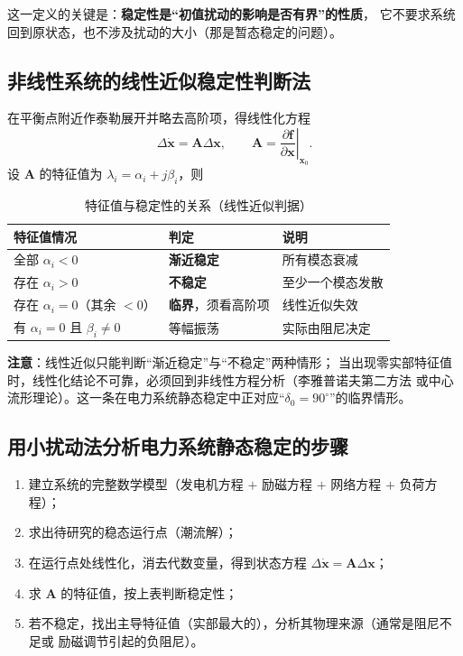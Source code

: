 这一定义的关键是：\textbf{稳定性是“初值扰动的影响是否有界”的性质}，
它不要求系统回到原状态，也不涉及扰动的大小（那是暂态稳定的问题）。

\subsection{非线性系统的线性近似稳定性判断法}

在平衡点附近作泰勒展开并略去高阶项，得线性化方程
\begin{equation}
  \Delta\dot{\boldsymbol x}=\boldsymbol A\Delta\boldsymbol x,
  \qquad \boldsymbol A=\left.\frac{\partial\boldsymbol f}{\partial\boldsymbol x}\right|_{\boldsymbol x_0}.
\end{equation}
设 $\boldsymbol A$ 的特征值为 $\lambda_i=\alpha_i+j\beta_i$，则
\begin{table}[htbp]
  \centering
  \caption{特征值与稳定性的关系（线性近似判据）}
  \small
  \begin{tabular}{@{}lll@{}}
    \toprule
    特征值情况 & 判定 & 说明 \\
    \midrule
    全部 $\alpha_i<0$ & \textbf{渐近稳定} & 所有模态衰减 \\
    存在 $\alpha_i>0$ & \textbf{不稳定} & 至少一个模态发散 \\
    存在 $\alpha_i=0$（其余 $<0$） & \textbf{临界}，须看高阶项 & 线性近似失效 \\
    有 $\alpha_i=0$ 且 $\beta_i\ne0$ & 等幅振荡 & 实际由阻尼决定 \\
    \bottomrule
  \end{tabular}
\end{table}

\textbf{注意}：线性近似只能判断“渐近稳定”与“不稳定”两种情形；
当出现零实部特征值时，线性化结论不可靠，必须回到非线性方程分析（李雅普诺夫第二方法
或中心流形理论）。这一条在电力系统静态稳定中正对应“$\delta_0=90^\circ$”的临界情形。

\subsection{用小扰动法分析电力系统静态稳定的步骤}

\begin{enumerate}
  \item 建立系统的完整数学模型（发电机方程 $+$ 励磁方程 $+$ 网络方程 $+$ 负荷方程）；
  \item 求出待研究的稳态运行点（潮流解）；
  \item 在运行点处线性化，消去代数变量，得到状态方程
        $\Delta\dot{\boldsymbol x}=\boldsymbol A\Delta\boldsymbol x$；
  \item 求 $\boldsymbol A$ 的特征值，按上表判断稳定性；
  \item 若不稳定，找出主导特征值（实部最大的），分析其物理来源（通常是阻尼不足或
        励磁调节引起的负阻尼）。
\end{enumerate}

